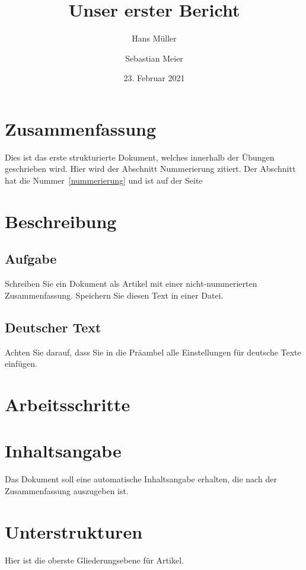 \documentclass[a4paper, 12pt]{article} %
\begin{document}

\setcounter{section}{0}

\title{Unser erster Bericht}
\author{Hans Müller \and Sebastian Meier}
\date{23. Februar 2021}
\maketitle
\section*{Zusammenfassung}

Dies ist das erste strukturierte Dokument, welches innerhalb der Übungen
geschrieben wird. Hier wird der Abschnitt \dq Nummerierung\dq{} zitiert.
Der Abschnitt hat die Nummer~\ref{nummerierung} und ist 
auf der Seite~\pageref{nummerierung}
\tableofcontents
\listoftables
\listoffigures

\section{Beschreibung}
\subsection{Aufgabe}\label{aufgabe}
Schreiben Sie ein Dokument als Artikel mit einer nicht-nummerierten
Zusammenfassung. Speichern Sie diesen Text in einer Datei.

\subsection{Deutscher Text}
Achten Sie darauf, dass Sie in die Präambel alle Einstellungen für 
deutsche Texte einfügen.

\section{Arbeitsschritte}

\section{Inhaltsangabe}
Das Dokument soll eine automatische Inhaltsangabe erhalten, die nach der 
Zusammenfassung auszugeben ist.

\section{Unterstrukturen}
Hier ist die oberste Gliederungsebene für Artikel.
\end{document}
